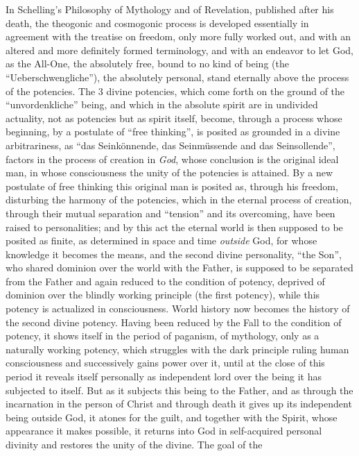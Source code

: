In Schelling's Philosophy of Mythology and of Revelation, published after
his death, the theogonic and cosmogonic process is developed essentially
in agreement with the treatise on freedom, only more fully worked out,
and with an altered and more definitely formed terminology, and with an
endeavor to let God, as the All-One, the absolutely free, bound to no
kind of being (the ``Ueberschwengliche''), the absolutely personal, stand
eternally above the process of the potencies. The 3 divine potencies,
which come forth on the ground of the ``unvordenkliche'' being, and which
in the absolute spirit are in undivided actuality, not as potencies but
as spirit itself, become, through a process whose beginning, by a
postulate of ``free thinking'', is posited as grounded in a divine
arbitrariness, as ``das Seinkönnende, das Seinmüssende and das
Seinsollende'', factors in the process of creation in \emph{God}, whose
conclusion is the original ideal man, in whose consciousness the unity of
the potencies is attained. By a new postulate of free thinking this
original man is posited as, through his freedom, disturbing the harmony
of the potencies, which in the eternal process of creation, through their
mutual separation and ``tension'' and its overcoming, have been raised to
personalities; and by this act the eternal world is then supposed to be
posited as finite, as determined in space and time \emph{outside} God,
for whose knowledge it becomes the means, and the second divine
personality, ``the Son'', who shared dominion over the world with the
Father, is supposed to be separated from the Father and again reduced to
the condition of potency, deprived of dominion over the blindly working
principle (the first potency), while this potency is actualized in
consciousness. World history now becomes the history of the second
divine potency. Having been reduced by the Fall to the condition of
potency, it shows itself in the period of paganism, of mythology, only as
a naturally working potency, which struggles with the dark
principle ruling human consciousness and successively gains power over
it, until at the close of this period it reveals itself personally as
independent lord over the being it has subjected to itself. But as it
subjects this being to the Father, and as through the incarnation in the
person of Christ and through death it gives up its independent being
outside God, it atones for the guilt, and together with the Spirit, whose
appearance it makes possible, it returns into God in self-acquired
personal divinity and restores the unity of the divine. The goal of the
